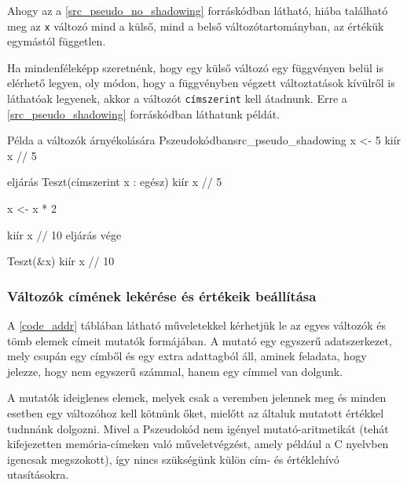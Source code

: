Ahogy az a \ref{src_pseudo_no_shadowing} forráskódban látható, hiába található meg az \texttt{x} változó mind a külső, mind a belső változótartományban, az értékük egymástól független.

Ha mindenféleképp szeretnénk, hogy egy külső változó egy függvényen belül is elérhető legyen, oly módon, hogy a függvényben végzett változtatások kívülről is láthatóak legyenek, akkor a változót \texttt{címszerint} kell átadnunk. Erre a \ref{src_pseudo_shadowing} forráskódban láthatunk példát.

\begin{code}{Példa a változók árnyékolására Pszeudokódban}{src_pseudo_shadowing}
x <- 5
kiír x // 5

eljárás Teszt(címszerint x : egész)
    kiír x // 5

    x <- x * 2

    kiír x // 10
eljárás vége

Teszt(&x)
kiír x // 10
\end{code}

\subsubsection{Változók címének lekérése és értékeik beállítása}


A \ref{code_addr} táblában látható műveletekkel kérhetjük le az egyes változók és tömb elemek címeit mutatók formájában. A mutató egy egyszerű adatszerkezet, mely csupán egy címből és egy extra adattagból áll, aminek feladata, hogy jelezze, hogy nem egyszerű számmal, hanem egy címmel van dolgunk.

A mutatók ideiglenes elemek, melyek csak a veremben jelennek meg és minden esetben egy változóhoz kell kötnünk őket, mielőtt az általuk mutatott értékkel tudnnánk dolgozni. Mivel a Pszeudokód nem igényel mutató-aritmetikát (tehát kifejezetten memória-címeken való műveletvégzést, amely például a C nyelvben igencsak megszokott), így nincs szükségünk külön cím- és értéklehívó utasításokra.


